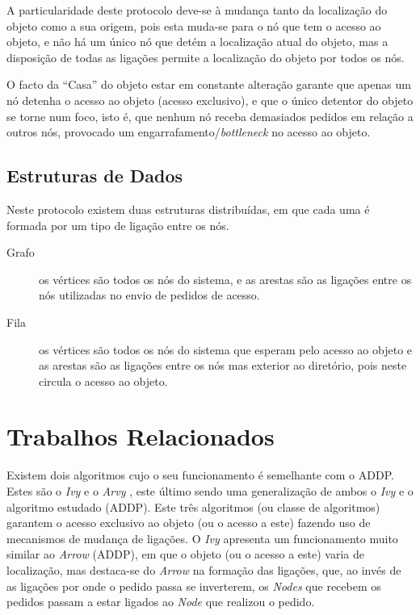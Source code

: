  

\noindent A particularidade deste protocolo deve-se à mudança tanto da localização do objeto como a sua origem, pois esta muda-se para o nó que tem o acesso ao objeto, e não há um único nó que detém a localização atual do objeto, mas a disposição de todas as ligações permite a localização do objeto por todos os nós.

O facto da ``Casa'' do objeto estar em constante alteração garante que apenas um nó detenha o acesso ao objeto (acesso exclusivo), e que o único detentor do objeto se torne num foco, isto é, que nenhum nó receba demasiados pedidos em relação a outros nós, provocado um engarrafamento/\emph{bottleneck} no acesso ao objeto.


\subsection*{Estruturas de Dados}
Neste protocolo existem duas estruturas distribuídas, em que cada uma é formada por um tipo de ligação entre os nós.

\begin{description} 
    \item [Grafo] os vértices são todos os nós do sistema, e as arestas são as ligações entre os nós utilizadas no envio de pedidos de acesso.
    \item [Fila] os vértices são todos os nós do sistema que esperam pelo acesso ao objeto  e as arestas são as ligações entre os nós mas exterior ao diretório, pois neste circula o acesso ao objeto.
\end{description}

\section{Trabalhos Relacionados}
\label{motivacao:sec:trabalhos_relacionados}

Existem dois algoritmos cujo o seu funcionamento é semelhante com o \acs*{ADDP}.
Estes são o \emph{Ivy} \cite{Ivy} e o \emph{Arvy} \cite{Arvy}, este último sendo uma generalização de ambos o \emph{Ivy} e o algoritmo estudado (\acs{ADDP}).
Este três algoritmos (ou classe de algoritmos) garantem o acesso exclusivo ao objeto (ou o acesso a este) fazendo uso de mecanismos de mudança de ligações.
O \emph{Ivy} apresenta um funcionamento muito similar ao \emph{Arrow} (\acs*{ADDP}),
em que o objeto (ou o acesso a este) varia de localização,
mas destaca-se do \emph{Arrow} na formação das ligações, que,
ao invés de as ligações por onde o pedido passa se inverterem,
os \emph{Nodes} que recebem os pedidos passam a estar ligados ao \emph{Node} que realizou o pedido.


